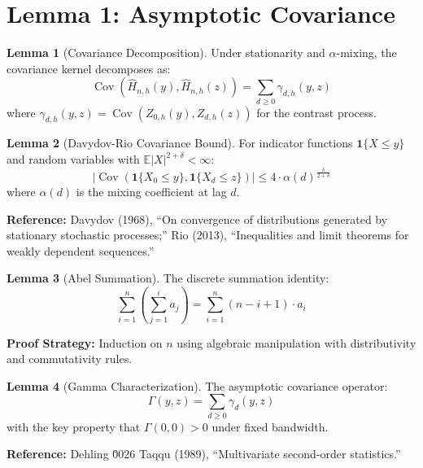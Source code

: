 \documentclass[11pt,a4paper]{amsart}
\theoremstyle{definition}
\newtheorem{lemma}{Lemma}[section]
\newcommand{\ind}{\mathbf{1}}
\newcommand{\E}{\mathbb{E}}
\newcommand{\Cov}{\operatorname{Cov}}
\begin{document}
\section{Lemma 1: Asymptotic Covariance}
\label{sec:lemma1}

\begin{lemma}[Covariance Decomposition]
\label{lem:cov-decomp}
Under stationarity and $\alpha$-mixing, the covariance kernel decomposes as:
\begin{equation*}
\Cov(\hat{H}_{n,h}(y), \hat{H}_{n,h}(z)) = \sum_{d \geq 0} \gamma_{d,h}(y,z)
\end{equation*}
where $\gamma_{d,h}(y,z) = \Cov(Z_{0,h}(y), Z_{d,h}(z))$ for the contrast process.
\end{lemma}

\begin{lemma}[Davydov-Rio Covariance Bound]
\label{lem:davydov}
For indicator functions $\ind\{X \leq y\}$ and random variables with $\E|X|^{2+\delta} < \infty$:
\begin{equation*}
|\Cov(\ind\{X_0 \leq y\}, \ind\{X_d \leq z\})| \leq 4 \cdot \alpha(d)^{\frac{\delta}{2+\delta}}
\end{equation*}
where $\alpha(d)$ is the mixing coefficient at lag $d$.

\textbf{Reference:} Davydov (1968), ``On convergence of distributions generated by 
stationary stochastic processes;'' Rio (2013), ``Inequalities and limit theorems 
for weakly dependent sequences.''
\end{lemma}

\begin{lemma}[Abel Summation]
\label{lem:abel-summation}
The discrete summation identity:
\begin{equation*}
\sum_{i=1}^n \left(\sum_{j=1}^i a_j\right) = \sum_{i=1}^n (n - i + 1) \cdot a_i
\end{equation*}

\textbf{Proof Strategy:} Induction on $n$ using algebraic manipulation with 
distributivity and commutativity rules.
\end{lemma}

\begin{lemma}[Gamma Characterization]
\label{lem:gamma-char}
The asymptotic covariance operator:
\begin{equation*}
\Gamma(y,z) = \sum_{d \geq 0} \gamma_d(y,z)
\end{equation*}
with the key property that $\Gamma(0,0) > 0$ under fixed bandwidth.

\textbf{Reference:} Dehling \u0026 Taqqu (1989), ``Multivariate second-order statistics.''
\end{lemma}
\end{document}
